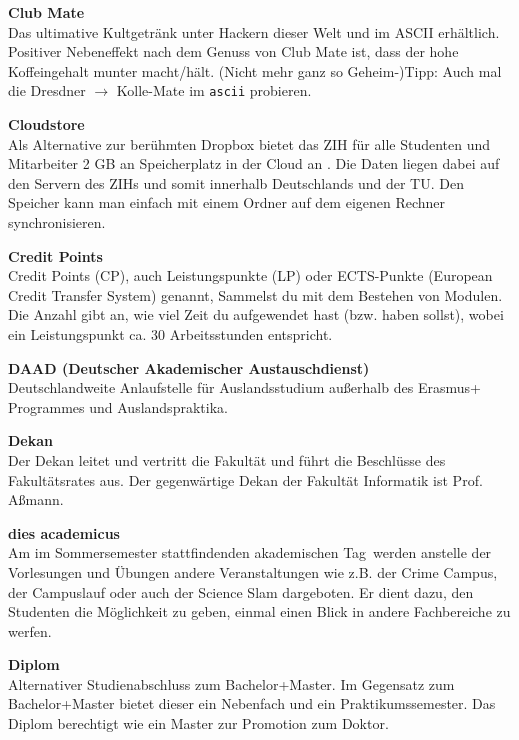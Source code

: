 \begin{multicols}{2}
\textbf{Club Mate} \\
Das ultimative Kultgetränk unter Hackern dieser Welt und im ASCII erhältlich.
Positiver Nebeneffekt nach dem Genuss von Club Mate ist, dass der hohe Koffeingehalt munter macht/hält.
(Nicht mehr ganz so Geheim-)Tipp:
Auch mal die Dresdner $\rightarrow$ Kolle-Mate im \texttt{ascii} probieren. 

\textbf{Cloudstore} \\
Als Alternative zur berühmten Dropbox bietet das ZIH für alle Studenten und Mitarbeiter 2 GB an Speicherplatz in der Cloud an .
Die Daten liegen dabei auf den Servern des ZIHs und somit innerhalb Deutschlands und der TU. 
Den Speicher kann man einfach mit einem Ordner auf dem eigenen Rechner synchronisieren.

\vfill\columnbreak

\textbf{Credit Points} \\
Credit Points (CP), auch Leistungspunkte (LP) oder ECTS-Punkte (European Credit Transfer System) genannt, Sammelst du mit dem Bestehen von Modulen.
Die Anzahl gibt an, wie viel Zeit du aufgewendet hast (bzw. haben sollst), wobei ein Leistungspunkt ca. 30 Arbeitsstunden entspricht.

\textbf{DAAD (Deutscher Akademischer Austauschdienst)} \\
Deutschlandweite Anlaufstelle für Auslandsstudium außerhalb des Erasmus+ Programmes und Auslands\-praktika.

\textbf{Dekan} \\
Der Dekan leitet und vertritt die Fakultät und führt die Beschlüsse des Fakultätsrates aus.
Der gegenwärtige Dekan der Fakultät Informatik ist Prof. Aßmann.

\textbf{dies academicus} \\
Am im Sommersemester stattfindenden \glqq akademischen Tag\grqq\ werden anstelle der Vorlesungen und Übungen andere Veranstaltungen wie z.B. der Crime Campus, der Campuslauf oder auch der Science Slam dargeboten.
Er dient dazu, den Studenten die Möglichkeit zu geben, einmal einen Blick in andere Fachbereiche zu werfen. 

\textbf{Diplom} \\
Alternativer Studienabschluss zum Bachelor+Master.
Im Gegensatz zum Bachelor+Master bietet dieser ein Nebenfach und ein Praktikumssemester.
Das Diplom berechtigt wie ein Master zur Promotion zum Doktor.


\end{multicols}
